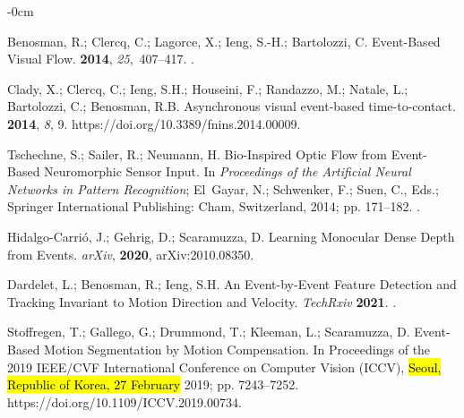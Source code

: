 \documentclass[brainsci, %
               review,accept,pdftex,moreauthors
               ]{Definitions/mdpi}
\begin{document}
\begin{adjustwidth}{-\extralength}{0cm}
\begin{thebibliography}{999}
Benosman, R.; Clercq, C.; Lagorce, X.; Ieng, {S.-H}.; Bartolozzi, C.
\newblock Event-{Based} {Visual} {Flow}.
 {\bf
  2014}, {\em 25},~407--417.
.

Clady, X.; Clercq, C.; Ieng, S.H.; Houseini, F.; Randazzo, M.; Natale, L.;
  Bartolozzi, C.; Benosman, R.B.
\newblock Asynchronous visual event-based time-to-contact.
 {\bf 2014}, {\em 8}, 9.
  {{https://doi.org/10.3389/fnins.2014.00009}}.

Tschechne, S.; Sailer, R.; Neumann, H.
\newblock Bio-{Inspired} {Optic} {Flow} from {Event}-{Based} {Neuromorphic}
  {Sensor} {Input}.
\newblock In \emph{Proceedings of the Artificial {Neural} {Networks} in {Pattern}
  {Recognition}}; El~Gayar, N.; Schwenker, F.; Suen, C., Eds.; Springer
  International Publishing: Cham, Switzerland, 2014; pp. 171--182.
.

Hidalgo-Carrió, J.; Gehrig, D.; Scaramuzza, D.
\newblock Learning {Monocular} {Dense} {Depth} from {Events}.  \emph{arXiv}, {\bf 2020}, arXiv:2010.08350.

Dardelet, L.; Benosman, R.; Ieng, S.H.
\newblock An {Event}-by-{Event} {Feature} {Detection} and {Tracking}
  {Invariant} to {Motion} {Direction} and {Velocity}. \emph{TechRxiv} {\bf 2021}.
.

Stoffregen, T.; Gallego, G.; Drummond, T.; Kleeman, L.; Scaramuzza, D.
\newblock Event-{Based} {Motion} {Segmentation} by {Motion} {Compensation}.
\newblock In Proceedings of the 2019 {IEEE}/{CVF} {International} {Conference}
  on {Computer} {Vision} ({ICCV}), \hl{Seoul, Republic of Korea, 27 February} %
 2019; pp. 7243--7252.
 {{https://doi.org/10.1109/ICCV.2019.00734}}.


\end{thebibliography}
\end{adjustwidth}
\end{document}
